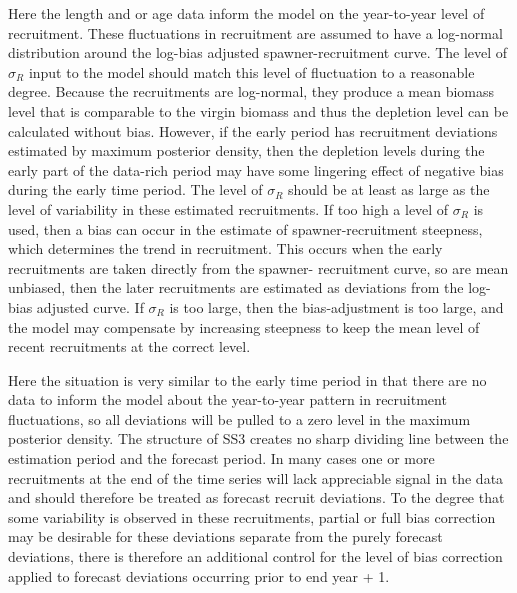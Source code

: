 Here the length and or age data inform the model on the year-to-year level of recruitment. These fluctuations in recruitment are assumed to have a log-normal distribution around the log-bias adjusted spawner-recruitment curve. The level of $\sigma_R$ input to the model should match this level of fluctuation to a reasonable degree. Because the recruitments are log-normal, they produce a mean biomass level that is comparable to the virgin biomass and thus the depletion level can be calculated without bias. However, if the early period has recruitment deviations estimated by maximum posterior density, then the depletion levels during the early part of the data-rich period may have some lingering effect of negative bias during the early time period. The level of $\sigma_R$ should be at least as large as the level of variability in these estimated recruitments. If too high a level of $\sigma_R$ is used, then a bias can occur in the estimate of spawner-recruitment steepness, which determines the trend in recruitment. This occurs when the early recruitments are taken directly from the spawner- recruitment curve, so are mean unbiased, then the later recruitments are estimated as deviations from the log-bias adjusted curve. If $\sigma_R$ is too large, then the bias-adjustment is too large, and the model may compensate by increasing steepness to keep the mean level of recent recruitments at the correct level.

Here the situation is very similar to the early time period in that there are no data to inform the model about the year-to-year pattern in recruitment fluctuations, so all deviations will be pulled to a zero level in the maximum posterior density. The structure of SS3 creates no sharp dividing line between the estimation period and the forecast period. In many cases one or more recruitments at the end of the time series will lack appreciable signal in the data and should therefore be treated as forecast recruit deviations. To the degree that some variability is observed in these recruitments, partial or full bias correction may be desirable for these deviations separate from the purely forecast deviations, there is therefore an additional control for the level of bias correction applied to forecast deviations occurring prior to end year + 1.

